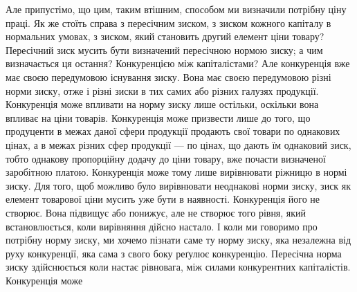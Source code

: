 Але припустімо, що цим, таким втішним, способом ми визначили потрібну
ціну праці. Як же стоїть справа з пересічним зиском, з зиском кожного капіталу
в нормальних умовах, з зиском, який становить другий елемент ціни товару?
Пересічний зиск мусить бути визначений пересічною нормою зиску; а чим визначається
ця остання? Конкуренцією між капіталістами? Але конкуренція вже має
своєю передумовою існування зиску. Вона має своєю передумовою різні
норми зиску, отже і різні зиски в тих самих або різних галузях продукції. Конкуренція
може впливати на норму зиску лише остільки, оскільки вона впливає на
ціни товарів. Конкуренція може призвести лише до того, що продуценти в межах
даної сфери продукції продають свої товари по однакових цінах, а в межах різних
сфер продукції — по цінах, що дають їм однаковий зиск, тобто однакову пропорційну
додачу до ціни товару, вже почасти визначеної заробітною платою.
Конкуренція може тому лише вирівнювати ріжницю в нормі зиску. Для того,
щоб можливо було вирівнювати неоднакові норми зиску, зиск як елемент товарової
ціни мусить уже бути в наявності. Конкуренція його не створює. Вона
підвищує або понижує, але не створює того рівня, який встановлюється, коли
вирівняння дійсно настало. І коли ми говоримо про потрібну норму зиску, ми
хочемо пізнати саме ту норму зиску, яка незалежна від руху конкуренції, яка
сама з свого боку реґулює конкуренцію. Пересічна норма зиску здійснюється
коли настає рівновага, між силами конкурентних капіталістів. Конкуренція може
